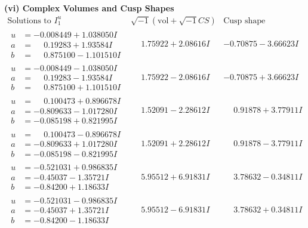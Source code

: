\documentclass[1p]{elsarticle_modified}
\theoremstyle{definition}
\newcommand{\I}{\sqrt{-1}}
\begin{document}
\newpage\flushleft \textbf{(vi) Complex Volumes and Cusp Shapes}
$$\begin{array}{c|c|c}  
\text{Solutions to }I^u_{1}& \I (\text{vol} + \sqrt{-1}CS) & \text{Cusp shape}\\
 \hline 
\begin{aligned}
u &= -0.008449 + 1.038050 I \\
a &= \phantom{-}0.19283 + 1.93584 I \\
b &= \phantom{-}0.875100 - 1.101510 I\end{aligned}
 & \phantom{-}1.75922 + 2.08616 I & -0.70875 - 3.66623 I \\ \hline\begin{aligned}
u &= -0.008449 - 1.038050 I \\
a &= \phantom{-}0.19283 - 1.93584 I \\
b &= \phantom{-}0.875100 + 1.101510 I\end{aligned}
 & \phantom{-}1.75922 - 2.08616 I & -0.70875 + 3.66623 I \\ \hline\begin{aligned}
u &= \phantom{-}0.100473 + 0.896678 I \\
a &= -0.809633 - 1.017280 I \\
b &= -0.085198 + 0.821995 I\end{aligned}
 & \phantom{-}1.52091 - 2.28612 I & \phantom{-}0.91878 + 3.77911 I \\ \hline\begin{aligned}
u &= \phantom{-}0.100473 - 0.896678 I \\
a &= -0.809633 + 1.017280 I \\
b &= -0.085198 - 0.821995 I\end{aligned}
 & \phantom{-}1.52091 + 2.28612 I & \phantom{-}0.91878 - 3.77911 I \\ \hline\begin{aligned}
u &= -0.521031 + 0.986835 I \\
a &= -0.45037 - 1.35721 I \\
b &= -0.84200 + 1.18633 I\end{aligned}
 & \phantom{-}5.95512 + 6.91831 I & \phantom{-}3.78632 - 0.34811 I \\ \hline\begin{aligned}
u &= -0.521031 - 0.986835 I \\
a &= -0.45037 + 1.35721 I \\
b &= -0.84200 - 1.18633 I\end{aligned}
 & \phantom{-}5.95512 - 6.91831 I & \phantom{-}3.78632 + 0.34811 I \\ \hline\begin{aligned}

\end{aligned}
\end{array}$$
\end{document}
